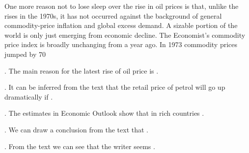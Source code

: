 One more reason not to lose sleep over the rise in oil prices is that, unlike the rises in the 1970s, it has not occurred against the background of general commodity-price inflation and global excess demand. A sizable portion of the world is only just emerging from economic decline. The Economist’s commodity price index is broadly unchanging from a year ago. In 1973 commodity prices jumped by 70%
\begin{questions} 
    .	The main reason for the latest rise of oil price is \ltk{}.\\

.	It can be inferred from the text that the retail price of petrol will go up dramatically if \ltk{}.\\

.	The estimates in Economic Outlook show that in rich countries \ltk{}.\\

.	We can draw a conclusion from the text that \ltk{}.\\

.	From the text we can see that the writer seems \ltk{}.\\
\end{questions}

